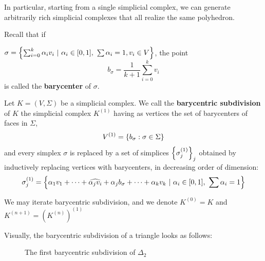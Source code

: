 In particular, starting from a single simplicial complex, we can generate arbitrarily rich simplicial complexes that all realize the same polyhedron.
\begin{definition}
    Recall that if 
    
    $\sigma=\set{\sum_{i=0}^k \alpha_i v_i\ |\ \alpha_i\in[0,1],\ \sum\alpha_i=1, v_i\in V}$, the point
    \[b_\sigma=\frac{1}{k+1}\sum_{i=0}^k v_i\]
    is called the \textbf{barycenter} of $\sigma$.

    Let $K=(V,\Sigma)$ be a simplicial complex. We call the \textbf{barycentric subdivision} of $K$ the simplicial complex $K^{(1)}$ having as vertices the set of barycenters of faces in $\Sigma$,
    \[V^{(1)}=\left\{ b_\sigma:\sigma\in\Sigma \right\}\]
    and every simplex $\sigma$ is replaced by a set of simplices $\left\{ \sigma_j^{(1)} \right\}_j$ 
    obtained by inductively replacing vertices with barycenters, in decreasing order of dimension:
    \[\sigma^{(1)}_{j}=\left\{ \alpha_1 v_1+\cdots+\widehat{\alpha_j v_i}+\alpha_j b_{\sigma}+\cdots+\alpha_k v_k\ |\ \alpha_i\in[0,1],\ \sum\alpha_i=1 \right\}\]

    We may iterate barycentric subdivision, and we denote $K^{(0)}=K$ and $K^{(n+1)}=(K^{(n)})^{(1)}$
\end{definition}
Visually, the barycentric subdivision of a triangle looks as follows:
\begin{figure}[H]
\caption{The first barycentric subdivision of $\Delta_2$}
\end{figure}

